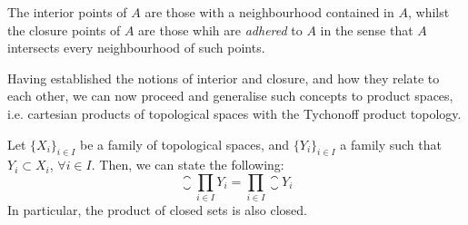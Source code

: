 \begin{remark}
	The interior points of $A$ are those with a neighbourhood contained in $A$, whilst the closure points of $A$ are those whih are \emph{adhered} to $A$ in the sense that $A$ intersects every neighbourhood of such points.
\end{remark}

Having established the notions of interior and closure, and how they relate to each other, we can now proceed and generalise such concepts to product spaces, i.e. cartesian products of topological spaces with the Tychonoff product topology.

\begin{theorem}
	\label{th:interior-closure-product-space}
	Let $\{X_i\}_{i\in I}$ be a family of topological spaces, and $\{Y_i\}_{i\in I}$ a family such that $Y_i\subset X_i$, $\forall i\in I$. Then, we can state the following:
	\[\closure{\prod_{i\in I}Y_i}=\prod_{i\in I}\closure{Y_i}\]
	In particular, the product of closed sets is also closed.
\end{theorem}

